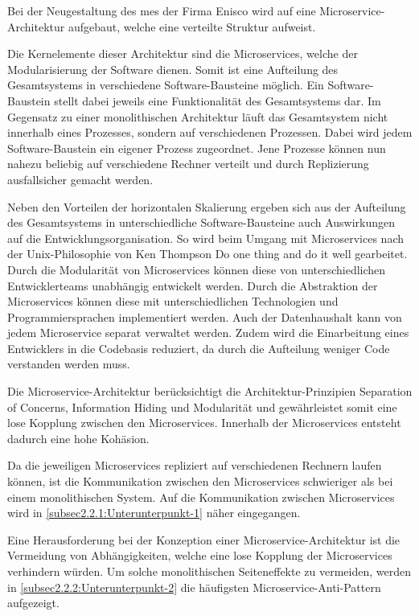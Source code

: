Bei der Neugestaltung des \gls{mes} der Firma Enisco wird auf eine Microservice-Architektur aufgebaut, welche eine verteilte Struktur aufweist.

Die Kernelemente dieser Architektur sind die Microservices, welche der Modularisierung der Software dienen. Somit ist eine Aufteilung des Gesamtsystems in verschiedene Software-Bausteine möglich. Ein Software-Baustein stellt dabei jeweils eine Funktionalität des Gesamtsystems dar. Im Gegensatz zu einer monolithischen Architektur läuft das Gesamtsystem nicht innerhalb eines Prozesses, sondern auf verschiedenen Prozessen. Dabei wird jedem Software-Baustein ein eigener Prozess zugeordnet. Jene Prozesse können nun nahezu beliebig auf verschiedene Rechner verteilt und durch Replizierung ausfallsicher gemacht werden. \cite{GaryCalcott.2018}

Neben den Vorteilen der horizontalen Skalierung ergeben sich aus der Aufteilung des Gesamtsystems in unterschiedliche Software-Bausteine auch Auswirkungen auf die Entwicklungsorganisation. So wird beim Umgang mit Microservices nach der Unix-Philosophie von Ken Thompson \glqq Do one thing and do it well\grqq{} \cite{IONOSSE.2021} gearbeitet. Durch die Modularität von Microservices können diese von unterschiedlichen Entwicklerteams unabhängig entwickelt werden. Durch die Abstraktion der Microservices können diese mit unterschiedlichen Technologien und Programmiersprachen implementiert werden. Auch der Datenhaushalt kann von jedem Microservice separat verwaltet werden. Zudem wird die Einarbeitung eines Entwicklers in die Codebasis reduziert, da durch die Aufteilung weniger Code verstanden werden muss.

Die Microservice-Architektur berücksichtigt die Architektur-Prinzipien Separation of Concerns, Information Hiding und Modularität und gewährleistet somit eine lose Kopplung zwischen den Microservices. Innerhalb der Microservices entsteht dadurch eine hohe Kohäsion.

Da die jeweiligen Microservices repliziert auf verschiedenen Rechnern laufen können, ist die Kommunikation zwischen den Microservices schwieriger als bei einem monolithischen System. Auf die Kommunikation zwischen Microservices wird in \autoref{subsec2.2.1:Unterunterpunkt-1} näher eingegangen.

Eine Herausforderung bei der Konzeption einer Microservice-Architektur ist die Vermeidung von Abhängigkeiten, welche eine lose Kopplung der Microservices verhindern würden. Um solche monolithischen Seiteneffekte zu vermeiden, werden in \autoref{subsec2.2.2:Unterunterpunkt-2} die häufigsten Microservice-Anti-Pattern aufgezeigt.

